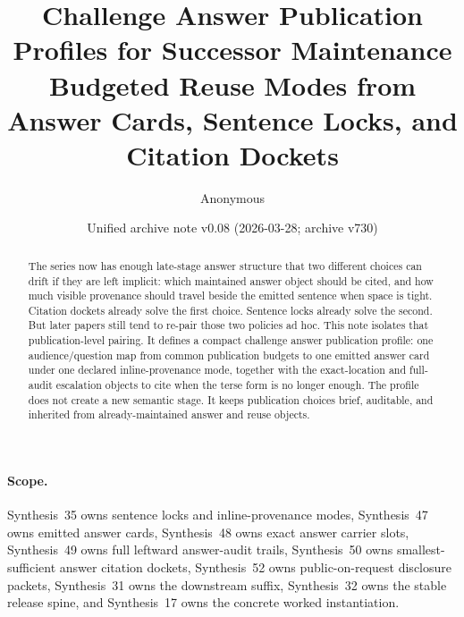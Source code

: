 \documentclass[11pt]{article}
\title{Challenge Answer Publication Profiles for Successor Maintenance\\\large Budgeted Reuse Modes from Answer Cards, Sentence Locks, and Citation Dockets}
\author{Anonymous}
\date{Unified archive note v0.08 (2026-03-28; archive v730)}
\begin{document}
\maketitle

\begin{abstract}
The series now has enough late-stage answer structure that two different choices can drift if they are left implicit: which maintained answer object should be cited, and how much visible provenance should travel beside the emitted sentence when space is tight. Citation dockets already solve the first choice. Sentence locks already solve the second. But later papers still tend to re-pair those two policies ad hoc. This note isolates that publication-level pairing. It defines a compact challenge answer publication profile: one audience/question map from common publication budgets to one emitted answer card under one declared inline-provenance mode, together with the exact-location and full-audit escalation objects to cite when the terse form is no longer enough. The profile does not create a new semantic stage. It keeps publication choices brief, auditable, and inherited from already-maintained answer and reuse objects.
\end{abstract}

\paragraph{Scope.}
Synthesis~35 owns sentence locks and inline-provenance modes, Synthesis~47 owns emitted answer cards, Synthesis~48 owns exact answer carrier slots, Synthesis~49 owns full leftward answer-audit trails, Synthesis~50 owns smallest-sufficient answer citation dockets, Synthesis~52 owns public-on-request disclosure packets, Synthesis~31 owns the downstream suffix, Synthesis~32 owns the stable release spine, and Synthesis~17 owns the concrete worked instantiation.\cite{series:sentencelocks,series:challengeanswercards,series:challengeanswercarrierslots,series:challengeansweraudittrails,series:challengeanswercitationdockets,series:challengeanswerdisclosurepackets,series:downstreamnormalforms,series:releasespine,series:workedexample}
\end{document}
